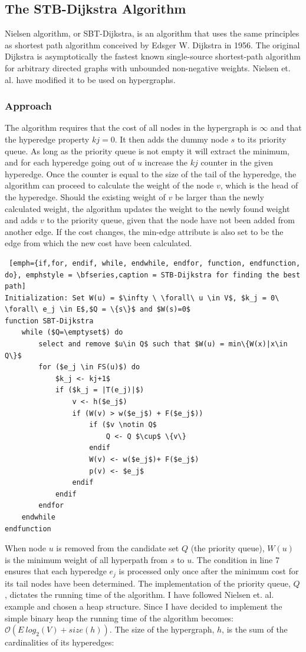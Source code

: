 \documentclass[a4paper,10pt,titlepage]{paper}
\begin{document}
\subsection{The STB-Dijkstra Algorithm} \label{STB-Dijkstra}
Nielsen algorithm, or SBT-Dijkstra, is an algorithm that uses the same principles as shortest path algorithm conceived by Edsger W. Dijkstra in 1956. The original Dijkstra is asymptotically the fastest known single-source shortest-path algorithm for arbitrary directed graphs with unbounded non-negative weights. \cite{Dijkstra} Nielsen et. al. have modified it to be used on hypergraphs.
\subsubsection{Approach}
The algorithm requires that the cost of all nodes in the hypergraph is $\infty$ and that the hyperedge property $kj=0$. It then adds the dummy node $s$ to its priority queue. As long as the priority queue is not empty it will extract the minimum, and for each hyperedge going out of $u$ increase the $kj$ counter in the given hyperedge. Once the counter is equal to the size of the tail of the hyperedge, the algorithm can proceed to calculate the weight of the node $v$, which is the head of the hyperedge. Should the existing weight of $v$ be larger than the newly calculated weight, the algorithm updates the weight to the newly found weight and adds $v$ to the priority queue, given that the node have not been added from another edge. If the cost changes, the min-edge attribute is also set to be the edge from which the new cost have been calculated.
\begin{lstlisting} [emph={if,for, endif, while, endwhile, endfor, function, endfunction, do}, emphstyle = \bfseries,caption = STB-Dijkstra for finding the best path]
Initialization: Set W(u) = $\infty \ \forall\ u \in V$, $k_j = 0\ \forall\ e_j \in E$,$Q = \{s\}$ and $W(s)=0$
function SBT-Dijkstra
	while ($Q=\emptyset$) do
		select and remove $u\in Q$ such that $W(u) = min\{W(x)|x\in Q\}$
		for ($e_j \in FS(u)$) do
			$k_j <- kj+1$
			if ($k_j = |T(e_j)|$) 
				v <- h($e_j$)
				if (W(v) > w($e_j$) + F($e_j$))
					if ($v \notin Q$  
						Q <- Q $\cup$ \{v\}
					endif
					W(v) <- w($e_j$)+ F($e_j$)
					p(v) <- $e_j$
				endif
			endif
		endfor
	endwhile
endfunction
\end{lstlisting}
When node $u$ is removed from the candidate set $Q$ (the priority queue), $W(u)$ is the minimum weight of all hyperpath from $s$ to $u$. The condition in line 7 ensures that each hyperedge $e_j$ is processed only once after the minimum cost for its tail nodes have been determined. The implementation of the priority queue, $Q$, dictates the running time of the algorithm. I have followed Nielsen et. al. example and chosen a heap structure. Since I have decided to implement the simple binary heap the running time of the algorithm becomes: $\mathcal{O}(E\ log_2(V) + size(h))$. The size of the hypergraph, $h$, is the sum of the cardinalities of its hyperedges:
\end{document}
